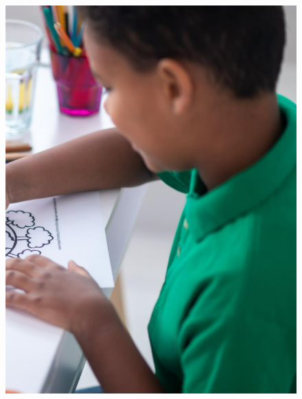 \begin{figure}[htpb]
\vspace*{-2.5cm}
\hspace{-3cm}\includegraphics[height=\paperheight]{../separadores/separadorART5B.png}
\end{figure}

\setcounter{chapter}{0}


